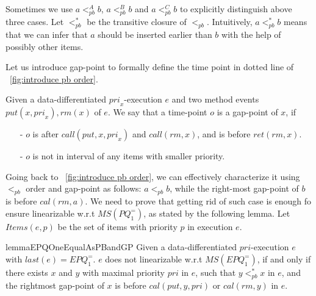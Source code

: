 Sometimes we use $a <_{\textit{pb}}^A b$, $a <_{\textit{pb}}^B b$ and $a <_{\textit{pb}}^C b$ to explicitly distinguish above three cases. Let $<_{\textit{pb}}^*$ be the transitive closure of $<_{\textit{pb}}$. Intuitively, $a <_{\textit{pb}}^* b$ means that we can infer that $a$ should be inserted earlier than $b$ with the help of possibly other items.

Let us introduce gap-point to formally define the time point in dotted line of \figurename~\ref{fig:introduce pb order}.


\begin{definition}\label{def:gap-point for matched put and rm operations}
Given a data-differentiated $\textit{pri}_x$-execution $e$ and two method events $\textit{put}(x,\textit{pri}_x),\textit{rm}(x)$ of $e$. We say that a time-point $o$ is a gap-point of $x$, if

\begin{itemize}
\setlength{\itemsep}{0.5pt}
\item[-] $o$ is after $\textit{call}(\textit{put},x,\textit{pri}_x)$ and $\textit{call}(\textit{rm},x)$, and is before $\textit{ret}(\textit{rm},x)$.

\item[-] $o$ is not in interval of any items with smaller priority.
\end{itemize}
\end{definition}

Going back to \figurename~\ref{fig:introduce pb order}, we can effectively characterize it using $<_{\textit{pb}}$ order and gap-point as follows: $a <_{\textit{pb}} b$, while the right-most gap-point of $b$ is before $\textit{cal}(\textit{rm},a)$. We need to prove that getting rid of such case is enough fo ensure linearizable w.r.t $\textit{MS}(\textit{PQ}_1^{=})$, as stated by the following lemma. Let $\textit{Items}(e,p)$ be the set of items with priority $p$ in execution $e$.


\begin{restatable}{lemma}{EPQOneEqualAsPBandGP}
\label{lemma:EPQ1Equal as pb order and gap-point}
Given a data-differentiated $\textit{pri}$-execution $e$ with $\textit{last}(e) = \textit{EPQ}_1^{=}$. $e$ does not linearizable w.r.t $\textit{MS}(\textit{EPQ}_1^{=})$, if and only if there exists $x$ and $y$ with maximal priority $\textit{pri}$ in $e$, such that $y <_{\textit{pb}}^* x$ in $e$, and the rightmost gap-point of $x$ is before $\textit{cal}(\textit{put},y,\textit{pri})$ or $\textit{cal}(\textit{rm},y)$ in $e$.
\end{restatable}

